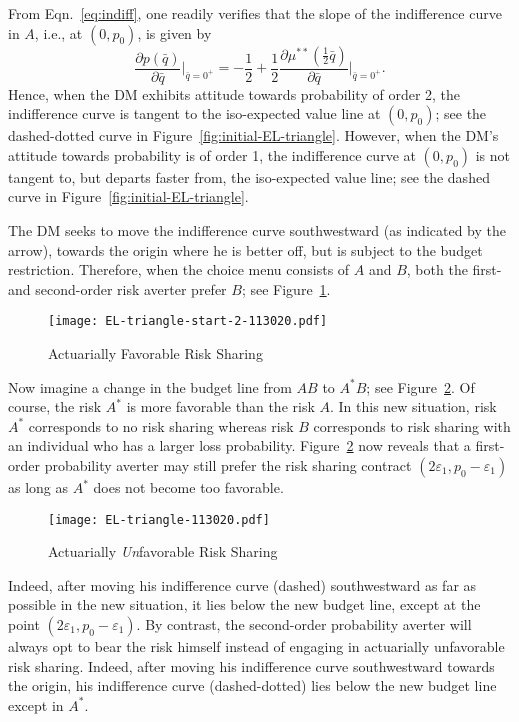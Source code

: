 \documentclass[11pt]{article}
\begin{document}
From Eqn.~\eqref{eq:indiff}, one readily verifies that the slope of the indifference curve in $A$, i.e., at $(0,p_{0})$,
is given by
\begin{equation*}
\frac{\partial p(\bar{q})}{\partial \bar{q}}\Big|_{\bar{q}=0^{+}}
=-\frac{1}{2}+\frac{1}{2}\frac{\partial \mu^{\ast\ast}\left(\tfrac{1}{2}\bar{q}\right)}{\partial \bar{q}}\Big|_{\bar{q}=0^{+}}.
\end{equation*}
Hence, when the DM exhibits attitude towards probability of order 2,
the indifference curve is tangent to the iso-expected value line at $(0,p_{0})$;
see the dashed-dotted curve in Figure~\ref{fig:initial-EL-triangle}.
However, when the DM's attitude towards probability is of order 1,
the indifference curve at $(0,p_{0})$ is not tangent to, but departs faster from, the iso-expected value line;
see the dashed curve in Figure~\ref{fig:initial-EL-triangle}.

The DM seeks to move the indifference curve southwestward (as indicated by the arrow),
towards the origin where he is better off, but is subject to the budget restriction.
Therefore, when the choice menu consists of $A$ and $B$, both the first- and second-order risk averter prefer $B$;
see Figure~\ref{fig:initial-optimum-EL-triangle}.
\vskip -0.5cm
\begin{figure}[H]
\begin{center}
\caption{Actuarially Favorable Risk Sharing
}
\vskip 0.37cm
\texttt{[image: EL-triangle-start-2-113020.pdf]}
\label{fig:initial-optimum-EL-triangle}
\end{center}
\end{figure}

Now imagine a change in the budget line from $AB$ to $A^{\ast}B$; see Figure~\ref{fig:EL-triangle}.
Of course, the risk $A^{\ast}$ is more favorable than the risk $A$.
In this new situation, risk $A^{\ast}$ corresponds to no risk sharing
whereas risk $B$ corresponds to risk sharing with an individual who has a larger loss probability.
Figure~\ref{fig:EL-triangle} now reveals that a first-order probability averter may still prefer the risk sharing contract $(2\varepsilon_{1},p_{0}-\varepsilon_{1})$
as long as $A^{\ast}$ does not become too favorable.
\vskip -0.5cm
\begin{figure}[H]
\begin{center}
\caption{Actuarially \textit{Un}favorable Risk Sharing
}
\vskip 0.37cm
\texttt{[image: EL-triangle-113020.pdf]}
\label{fig:EL-triangle}
\end{center}
\end{figure}
\noindent Indeed, after moving his indifference curve (dashed) southwestward as far as possible in the new situation,
it lies below the new budget line, except at the point $(2\varepsilon_{1},p_{0}-\varepsilon_{1})$.
By contrast, the second-order probability averter will always opt to bear the risk himself
instead of engaging in actuarially unfavorable risk sharing. 
Indeed, 
after moving his indifference curve southwestward towards the origin,
his indifference curve (dashed-dotted) lies below the new budget line
except in $A^{\ast}$.
\end{document}
